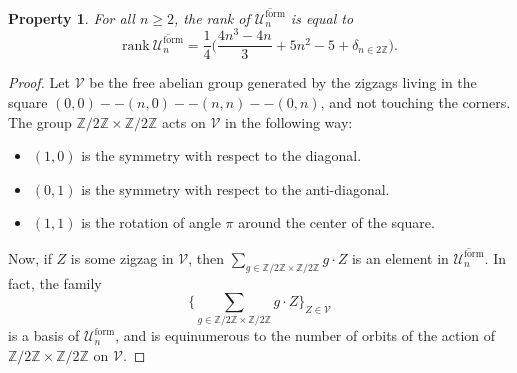 \documentclass[leqno]{article}
\newtheorem{Property}[equation]{Property}
\theoremstyle{definition}
\numberwithin{equation}{section}
\begin{document}
\begin{Property}
\label{comptage}
For all $n \geqslant 2$, the rank of $\overline{\mathcal{U}^{\text{form}}_n}$ is equal to
\[
\text{rank} \ \overline{\mathcal{U}^{\text{form}}_n}
=
\frac{1}{4}
\Big(\frac{4n^3 - 4n}{3}
+5n^2
- 5
+ \delta_{n \in 2\mathbb{Z}}
\Big).
\]
\end{Property}
\begin{proof}
Let $\mathcal{V}$ be the free abelian group generated by the zigzags living in the square $(0, 0) -- (n, 0) -- (n, n) -- (0, n)$, and not touching the corners. The group $\mathbb{Z}/2\mathbb{Z} \times \mathbb{Z}/2\mathbb{Z}$ acts on $\mathcal{V}$ in the following way:
\begin{itemize}
\item $(1, 0)$ is the symmetry with respect to the diagonal.
\item $(0, 1)$ is the symmetry with respect to the anti-diagonal.
\item $(1, 1)$ is the rotation of angle $\pi$ around the center of the square.
\end{itemize}
Now, if $Z$ is some zigzag in $\mathcal{V}$, then $\sum_{g \in \mathbb{Z}/2\mathbb{Z} \times \mathbb{Z}/2\mathbb{Z}} g \cdot Z$ is an element in $\overline{\mathcal{U}^{\text{form}}_n}$. In fact, the family
\[
\Big\{
\sum_{g \in \mathbb{Z}/2\mathbb{Z} \times \mathbb{Z}/2\mathbb{Z}} g \cdot Z
\Big\}_{Z \in \mathcal{V}}
\]
is a basis of $\mathcal{U}^{\text{form}}_n$, and is equinumerous to the number of orbits of the action of $\mathbb{Z}/2\mathbb{Z} \times \mathbb{Z}/2\mathbb{Z}$ on $\mathcal{V}$.


\end{proof}
\end{document}
